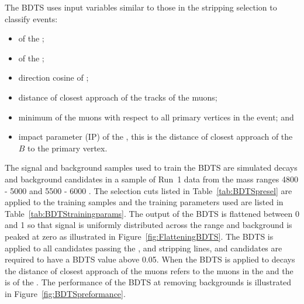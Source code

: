 The BDTS uses input variables similar to those in the stripping selection to classify events:
\begin{itemize}
\item \chiIP of the \bsd;
\item \chivtx of the \bsd;
\item direction cosine of \bsd;
\item distance of closest approach of the tracks of the muons;
\item minimum \chiIP of the muons with respect to all primary vertices in the event; and 
\item impact parameter (IP) of the \bsd, this is the distance of closest approach of the $B$ to the primary vertex.
\end{itemize}
The signal and background samples used to train the BDTS are simulated \bsmumu decays and background candidates in a sample of Run~1 data from the mass ranges 4800 - 5000 \mevcc and 5500 - 6000 \mevcc. The selection cuts listed in Table~\ref{tab:BDTSpresel} are applied to the training samples and the training parameters used are listed in Table~\ref{tab:BDTStrainingparams}. The output of the BDTS is flattened between 0 and 1 so that signal is uniformly distributed across the range and background is peaked at zero as illustrated in Figure~\ref{fig:FlatteningBDTS}. The BDTS is applied to all candidates passing the \bmumu, \bhh and \bujpsik stripping lines, and candidates are required to have a BDTS value above 0.05. When the BDTS is applied to \bujpsik decays the distance of closest approach of the muons refers to the muons in the \jpsi and the \chivtx is of the \jpsi. %
The performance of the BDTS at removing backgrounds is illustrated in Figure~\ref{fig:BDTSpreformance}. %


